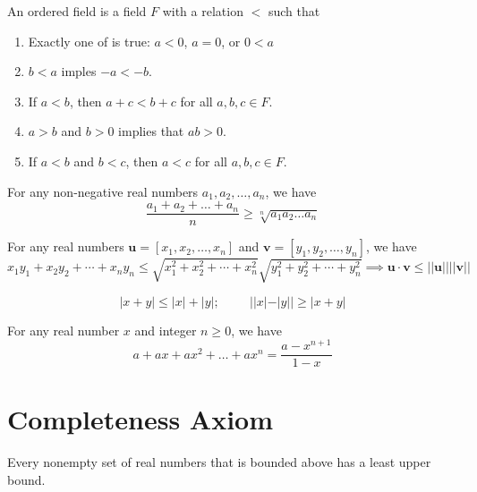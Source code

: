 \documentclass[12pt]{article}
\begin{document}
\begin{definition}
	An ordered field is a field $F$ with a relation $<$ such that
	\begin{enumerate}
		\item Exactly one of is true: $a < 0$, $a = 0$, or $0 < a$ 
		\item $b<a $ imples $ -a<-b$.
		\item If $a < b$, then $a+c < b+c$ for all $a,b,c \in F$.
		\item $a>b$ and $b>0$ implies that $ab>0$.
		\item If $a < b$ and $b < c$, then $a < c$ for all $a,b,c \in F$.
	\end{enumerate}
\end{definition}
\begin{theorem}[AM-GM Inequality]
	For any non-negative real numbers $a_1, a_2, \dots, a_n$, we have
	\begin{equation}
		\frac{a_1 + a_2 + \dots + a_n}{n} \geq \sqrt[n]{a_1 a_2 \dots a_n}
	\end{equation}
\end{theorem}
\begin{theorem}
	For any real numbers $\bm{u} = [x_1, x_2, \dots, x_n]$ and $\bm{v} = [y_1, y_2, \dots, y_n]$, we have
	\begin{equation}
		x_1y_1+x_2y_2+\cdots+x_ny_n \leq \sqrt{x_1^2+x_2^2+\cdots+x_n^2}\sqrt{y_1^2+y_2^2+\cdots+y_n^2} \implies \bm{u}\cdot \bm{v} \leq ||\bm{u}|| ||\bm{v}||
	\end{equation}
\end{theorem}
\begin{theorem}
	$$|x+y|\leq  |x|+|y|;\hspace{1cm} ||x|-|y|| \geq |x+y|$$
\end{theorem}
\begin{theorem}
	For any real number $x$ and integer $n \geq 0$, we have
	\begin{equation}
		a + ax + ax^2 + \dots + ax^n = \frac{a-x^{n+1}}{1-x}
	\end{equation}
\end{theorem}

\section{Completeness Axiom}

\begin{axiom}
	Every nonempty set of real numbers that is bounded above has a least upper bound.
\end{axiom}
\end{document}
